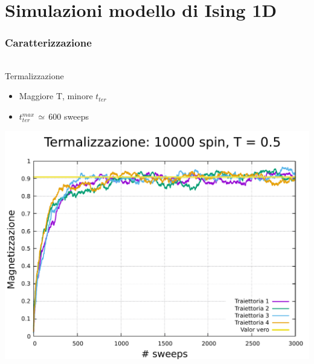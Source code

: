 \section{Simulazioni modello di Ising 1D}

\begin{frame}
    \frametitle{Caratterizzazione}
    \framesubtitle{}

    \begin{columns}
        \begin{column}{0.33\textwidth}
            \begin{block}{Termalizzazione}

                \begin{itemize}[itemsep=0.5em, label=$\diamond$]
                    \item Maggiore T, minore $t_{ter}$
                    \item $t_{ter}^{max}\,\simeq\,600$ sweeps
                \end{itemize}

                \vspace{0.5cm}

                \centering
                \includegraphics[width=\textwidth]{Immagini/simIsing1D/term_10000_1.5.pdf}
            
            \end{block}
        \end{column}
    

\end{columns}
\end{frame}
